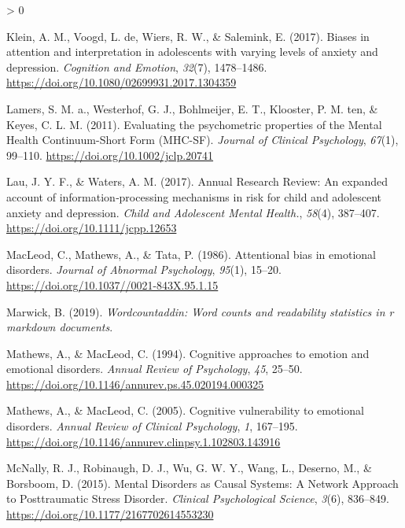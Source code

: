 \documentclass[
  english,
  man]{apa6}
\newlength{\cslhangindent}
\newenvironment{CSLReferences}[2] %
 {%
  \setlength{\parindent}{0pt}
  \ifodd #1 \everypar{\setlength{\hangindent}{\cslhangindent}}\ignorespaces\fi
  \ifnum #2 > 0
  \setlength{\parskip}{#2\baselineskip}
  \fi
 }%
 {}
\begin{document}
\begin{CSLReferences}{1}{0}
\leavevmode\hypertarget{ref-klein_biases_2017}{}%
Klein, A. M., Voogd, L. de, Wiers, R. W., \& Salemink, E. (2017). Biases in attention and interpretation in adolescents with varying levels of anxiety and depression. \emph{Cognition and Emotion}, \emph{32}(7), 1478--1486. \url{https://doi.org/10.1080/02699931.2017.1304359}

\leavevmode\hypertarget{ref-Lamers2011}{}%
Lamers, S. M. a., Westerhof, G. J., Bohlmeijer, E. T., Klooster, P. M. ten, \& Keyes, C. L. M. (2011). Evaluating the psychometric properties of the {Mental} {Health} {Continuum}-{Short} {Form} ({MHC}-{SF}). \emph{Journal of Clinical Psychology}, \emph{67}(1), 99--110. \url{https://doi.org/10.1002/jclp.20741}

\leavevmode\hypertarget{ref-lau_annual_2017}{}%
Lau, J. Y. F., \& Waters, A. M. (2017). Annual {Research} {Review}: {An} expanded account of information‐processing mechanisms in risk for child and adolescent anxiety and depression. \emph{Child and Adolescent Mental Health.}, \emph{58}(4), 387--407. \url{https://doi.org/10.1111/jcpp.12653}

\leavevmode\hypertarget{ref-MacLeod1986}{}%
MacLeod, C., Mathews, A., \& Tata, P. (1986). Attentional bias in emotional disorders. \emph{Journal of Abnormal Psychology}, \emph{95}(1), 15--20. \url{https://doi.org/10.1037//0021-843X.95.1.15}

\leavevmode\hypertarget{ref-R-wordcountaddin}{}%
Marwick, B. (2019). \emph{Wordcountaddin: Word counts and readability statistics in r markdown documents}.

\leavevmode\hypertarget{ref-Mathews1994}{}%
Mathews, A., \& MacLeod, C. (1994). Cognitive approaches to emotion and emotional disorders. \emph{Annual Review of Psychology}, \emph{45}, 25--50. \url{https://doi.org/10.1146/annurev.ps.45.020194.000325}

\leavevmode\hypertarget{ref-Mathews2005}{}%
Mathews, A., \& MacLeod, C. (2005). Cognitive vulnerability to emotional disorders. \emph{Annual Review of Clinical Psychology}, \emph{1}, 167--195. \url{https://doi.org/10.1146/annurev.clinpsy.1.102803.143916}

\leavevmode\hypertarget{ref-McNally2011}{}%
McNally, R. J., Robinaugh, D. J., Wu, G. W. Y., Wang, L., Deserno, M., \& Borsboom, D. (2015). Mental {Disorders} as {Causal} {Systems}: {A} {Network} {Approach} to {Posttraumatic} {Stress} {Disorder}. \emph{Clinical Psychological Science}, \emph{3}(6), 836--849. \url{https://doi.org/10.1177/2167702614553230}


\end{CSLReferences}
\end{document}

